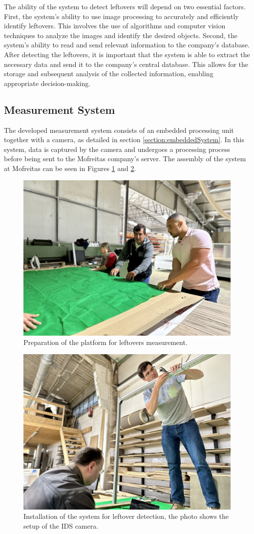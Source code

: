 The ability of the system to detect leftovers will depend on two essential factors. First, the system's ability to use image processing to accurately and efficiently identify leftovers. This involves the use of algorithms and computer vision techniques to analyze the images and identify the desired objects. Second, the system's ability to read and send relevant information to the company's database. After detecting the leftovers, it is important that the system is able to extract the necessary data and send it to the company's central database. This allows for the storage and subsequent analysis of the collected information, enabling appropriate decision-making.

\subsection{Measurement System}

The developed measurement system consists of an embedded processing unit together with a camera, as detailed in section \ref{section:embeddedSystem}. In this system, data is captured by the camera and undergoes a processing process before being sent to the Mofreitas company's server. The assembly of the system at Mofreitas can be seen in Figures \ref{fig:montagem2} and \ref{fig:camera2}.

\begin{figure}[!h]
    \centering
    \includegraphics[width=0.55\linewidth]{images/chap5/montagem2.jpg}
    \caption{Preparation of the platform for leftovers measurement.}
    \label{fig:montagem2}
\end{figure}

\begin{figure}[!ht]
    \centering
    \includegraphics[width=0.55\linewidth]{images/chap5/camera2.jpg}
    \caption{Installation of the system for leftover detection, the photo shows the setup of the IDS camera.}
    \label{fig:camera2}
\end{figure}

